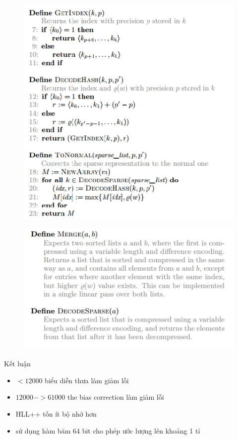 \documentclass{beamer}
\begin{document}
\begin{frame}
\begin{figure}[h]
\includegraphics[scale=0.7]{img9.png}
\end{figure}
\end{frame}
\begin{frame}
\begin{figure}[h]
\includegraphics[scale=0.7]{img10.png}
\end{figure}
\end{frame}
\begin{frame}{Kết luận}
\begin{itemize}
\item $<12000$ biểu diễn thưa làm giảm lỗi
\item $12000->61000$ the bias correction làm giảm lỗi
\item HLL++ tốn ít bộ nhớ hơn
\item sử dụng hàm băm 64 bit cho phép ước lượng lên khoảng 1 tỉ
\end{itemize}

\end{frame}
\end{document}
